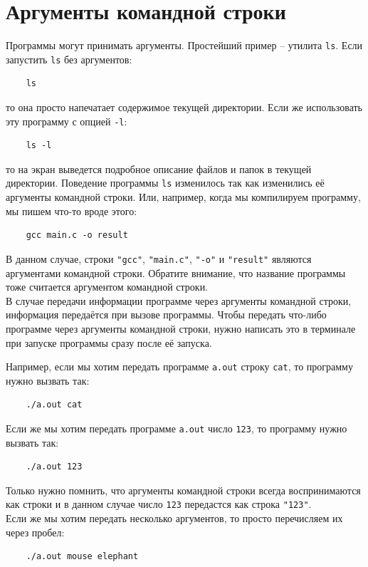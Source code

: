 \documentclass{article}
\begin{document}
\section*{Аргументы командной строки}
Программы могут принимать аргументы. Простейший пример -- утилита \texttt{ls}. Если запустить \texttt{ls} без аргументов:
\begin{verbatim}
    ls
\end{verbatim}
то она просто напечатает содержимое текущей директории.  Если же использовать эту программу с опцией \texttt{-l}: 
\begin{verbatim}
    ls -l
\end{verbatim}
то на экран выведется подробное описание файлов и папок в текущей директории.
Поведение программы \texttt{ls} изменилось так как изменились её аргументы командной строки.
Или, например, когда мы компилируем программу, мы пишем что-то вроде этого:
\begin{verbatim}
    gcc main.c -o result
\end{verbatim}
В данном случае, строки \texttt{"gcc"}, \texttt{"main.c"}, \texttt{"\--o"} и \texttt{"result"} являются аргументами командной строки. Обратите внимание, что название программы тоже считается аргументом командной строки.\\

В случае передачи информации программе через аргументы командной строки, информация передаётся при вызове 
программы. Чтобы передать что-либо программе через аргументы командной строки, нужно
написать это в терминале при запуске программы сразу после её запуска.

Например, если мы хотим передать программе \texttt{a.out} строку \texttt{cat}, то программу нужно вызвать так:
\begin{verbatim}
    ./a.out cat
\end{verbatim}

Если же мы хотим передать программе \texttt{a.out} число \texttt{123}, то программу нужно вызвать так:
\begin{verbatim}
    ./a.out 123
\end{verbatim}
Только нужно помнить, что аргументы командной строки всегда воспринимаются как строки и в данном случае 
число \texttt{123} передастся как строка \texttt{"123"}. \\

Если же мы хотим передать несколько аргументов, то
просто перечисляем их через пробел:
\begin{verbatim}
    ./a.out mouse elephant
\end{verbatim}
\end{document}
